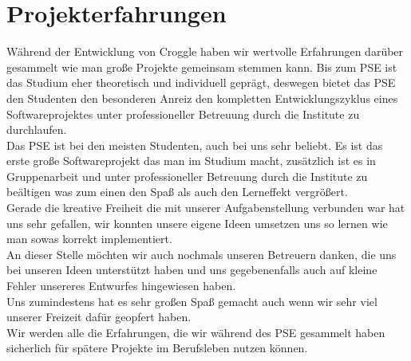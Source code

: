 \documentclass{scrartcl}
\begin{document}
	\section{Projekterfahrungen}

	Während der Entwicklung von Croggle haben wir wertvolle Erfahrungen darüber gesammelt wie man große Projekte gemeinsam stemmen kann. Bis zum PSE ist das Studium eher theoretisch und individuell geprägt, deswegen bietet das PSE den Studenten den besonderen Anreiz den kompletten Entwicklungszyklus eines Softwareprojektes unter professioneller Betreuung durch die Institute zu durchlaufen. \\
	



	Das PSE ist bei den meisten Studenten, auch bei uns sehr beliebt. 
	Es ist das erste große Softwareprojekt das man im Studium macht, zusätzlich ist es in Gruppenarbeit und unter professioneller Betreuung durch die Institute zu beältigen was zum einen den Spaß als auch den Lerneffekt vergrößert.\\
	Gerade die kreative Freiheit die mit unserer Aufgabenstellung verbunden war hat uns sehr gefallen, wir konnten unsere eigene Ideen umsetzen uns so lernen wie man sowas korrekt implementiert. \\
	An dieser Stelle möchten wir auch nochmals unseren Betreuern danken, die uns bei unseren Ideen unterstützt haben und uns gegebenenfalls auch auf kleine Fehler unsereres Entwurfes hingewiesen haben. \\
	Uns zumindestens hat es sehr großen Spaß gemacht auch wenn wir sehr viel unserer Freizeit dafür geopfert haben. \\
 	Wir werden alle die Erfahrungen, die wir während des PSE gesammelt haben sicherlich für spätere Projekte im Berufsleben nutzen können.     
\end{document}
